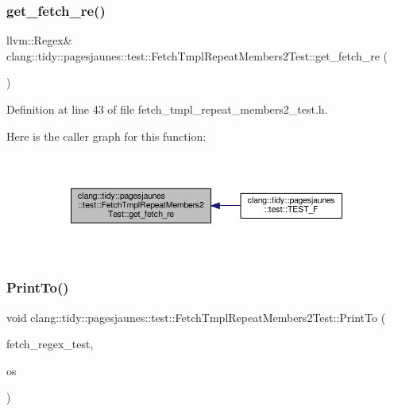 \subsubsection{\texorpdfstring{get\+\_\+fetch\+\_\+re()}{get\_fetch\_re()}}
{\footnotesize\ttfamily llvm\+::\+Regex\& clang\+::tidy\+::pagesjaunes\+::test\+::\+Fetch\+Tmpl\+Repeat\+Members2\+Test\+::get\+\_\+fetch\+\_\+re (\begin{DoxyParamCaption}{ }\end{DoxyParamCaption})\hspace{0.3cm}{\ttfamily [inline]}}



Definition at line 43 of file fetch\+\_\+tmpl\+\_\+repeat\+\_\+members2\+\_\+test.\+h.

Here is the caller graph for this function\+:
\nopagebreak
\begin{figure}[H]
\begin{center}
\leavevmode
\includegraphics[width=350pt]{classclang_1_1tidy_1_1pagesjaunes_1_1test_1_1_fetch_tmpl_repeat_members2_test_ad9f4aebd4b4c8047633817645148133b_icgraph}
\end{center}
\end{figure}
\mbox{\label{classclang_1_1tidy_1_1pagesjaunes_1_1test_1_1_fetch_tmpl_repeat_members2_test_aea87140ad60c9f846e24d399f0897de7}} 
\subsubsection{\texorpdfstring{Print\+To()}{PrintTo()}}
{\footnotesize\ttfamily void clang\+::tidy\+::pagesjaunes\+::test\+::\+Fetch\+Tmpl\+Repeat\+Members2\+Test\+::\+Print\+To (\begin{DoxyParamCaption}\item[{const \hyperlink{classclang_1_1tidy_1_1pagesjaunes_1_1test_1_1_fetch_tmpl_repeat_members2_test}{Fetch\+Tmpl\+Repeat\+Members2\+Test} \&}]{fetch\+\_\+regex\+\_\+test,  }\item[{\+::std\+::ostream $\ast$}]{os }\end{DoxyParamCaption})}



